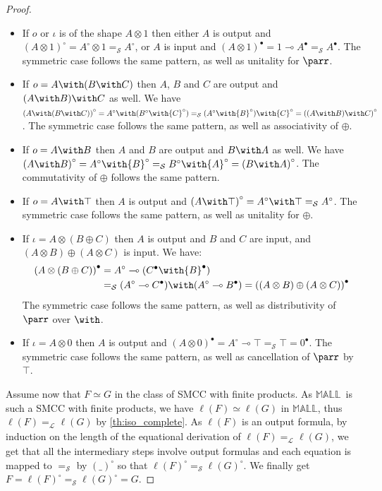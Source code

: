 \documentclass{lmcs}
\newcommand*{\tens}{\otimes} %
\newcommand*{\lolipop}{\multimap} %
\newcommand*{\iso}{\mathrel{\simeq}} %
\newcommand*{\Eu}{\mathcal{L}} %
\newcommand*{\eqeq}{=} %
\newcommand*{\eqEu}[1][]{\eqeq_{\Eu_{#1}}} %
\newcommand*{\isom}{\eqEu} %
\newcommand*{\thS}{\mathcal{S}}
\newcommand*{\isoo}{\eqeq_\thS} %
\newcommand*{\MALL}{\ensuremath{\mathbb{MALL}}}
\newcommand*{\iform}{\iota}
\newcommand*{\tradm}[1]{\ell(#1)}
\newcommand*{\tradi}[1]{{#1}^\bullet}
\newcommand*{\bigtradi}[1]{\tradi{(#1)}}
\newcommand*{\trado}[1]{{#1}^\circ}
\newcommand*{\bigtrado}[1]{\trado{(#1)}}
\begin{document}
\begin{proof}
\begin{itemize}
\begin{itemize}
  \item $A$ is output and $B$ is input, then $B\tens A$ is input and $\bigtradi{A\tens B} = \trado{A}\lolipop\tradi{B} = \bigtradi{B\tens A}$
  \item $A$ is input and $B$ is output, then $B\tens A$ is input and $\bigtradi{A\tens B} = \trado{B}\lolipop\tradi{A} = \bigtradi{B\tens A}$
  \end{itemize}
The commutativity of $\parr$ follows the same pattern.
\item If $o$ or $\iform$ is of the shape $A\tens 1$ then either $A$ is output and $\bigtrado{A\tens 1} = \trado{A}\tens 1 \isoo \trado{A}$,
or $A$ is input and $\bigtradi{A\tens 1} = 1\lolipop\tradi{A} \isoo \tradi{A}$.
The symmetric case follows the same pattern, as well as unitality for $\parr$.
\item If $o = A\with (B\with C)$ then $A$, $B$ and $C$ are output and $(A\with B)\with C$ as well.
We have $\bigtrado{A\with (B\with C)}=\trado{A}\with(\trado{B}\with\trado{C})\isoo(\trado{A}\with\trado{B})\with\trado{C}=\bigtrado{(A\with B)\with C}$.
The symmetric case follows the same pattern, as well as associativity of $\oplus$.
\item If $o = A\with B$ then $A$ and $B$ are output and $B\with A$ as well.
We have $\bigtrado{A\with B}=\trado{A}\with\trado{B}\isoo\trado{B}\with\trado{A}=\bigtrado{B\with A}$.
The commutativity of $\oplus$ follows the same pattern.
\item If $o = A\with\top$ then $A$ is output and $\bigtrado{A\with\top} = \trado{A}\with\top \isoo \trado{A}$.
The symmetric case follows the same pattern, as well as unitality for $\oplus$.
\item If $\iform = A\tens(B\oplus C)$ then $A$ is output and $B$ and $C$ are input, and $(A\tens B)\oplus(A\tens C)$ is input. We have:
  \begin{align*}
    \bigtradi{A\tens(B\oplus C)} &= \trado{A}\lolipop(\tradi{C}\with\tradi{B}) \\
       &\isoo (\trado{A}\lolipop\tradi{C})\with(\trado{A}\lolipop\tradi{B}) = \bigtradi{(A\tens B)\oplus(A\tens C)}
  \end{align*}
The symmetric case follows the same pattern, as well as distributivity of $\parr$ over $\with$.
\item If $\iform = A\tens 0$ then $A$ is output and $\bigtradi{A\tens 0} = \trado{A}\lolipop\top \isoo \top = \tradi{0}$.
The symmetric case follows the same pattern, as well as cancellation of $\parr$ by $\top$.
\end{itemize}
Assume now that $F\iso G$ in the class of SMCC with finite products.
As \MALL\ is such a SMCC with finite products, we have $\tradm{F}\iso\tradm{G}$ in \MALL, thus $\tradm{F}\isom\tradm{G}$ by \autoref{th:iso_complete}.
As $\tradm{F}$ is an output formula, by induction on the length of the equational derivation of $\tradm{F}\isom\tradm{G}$, we get that all the intermediary steps involve output formulas and each equation is mapped to $\isoo$ by $\bigtrado{\_}$ so that $\trado{\tradm{F}}\isoo\trado{\tradm{G}}$.
We finally get $F=\trado{\tradm{F}}\isoo\trado{\tradm{G}}= G$.


\end{proof}
\end{document}
